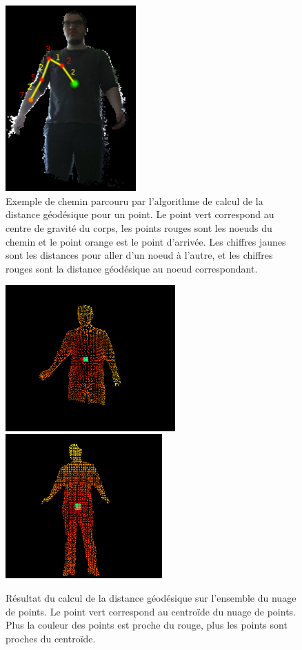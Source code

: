 \begin{figure}[!ht]
  \begin{center}
    \includegraphics[width=5cm]{image/cheminGeodesique.PNG}
    \caption{Exemple de chemin parcouru par l'algorithme de calcul de la distance géodésique pour un point.
    Le point vert correspond au centre de gravité du corps, les points rouges sont les noeuds du chemin et le point 
    orange est le point d'arrivée. Les chiffres jaunes sont les distances pour aller d'un noeud à l'autre, et les chiffres
    rouges sont la distance géodésique au noeud correspondant.}
    \label{fig:cheminGeodesique}
  \end{center}
\end{figure}

\begin{figure}[!ht]
  \begin{center}
    \includegraphics[width=6.5cm]{image/geodesic1.PNG}
    \includegraphics[width=6cm]{image/geodesic2.PNG}
    \caption{Résultat du calcul de la distance géodésique sur l'ensemble du nuage de points. Le point vert correspond au centroïde du
    nuage de points. Plus la couleur des points est proche du rouge, plus les points sont proches du centroïde.}
    \label{fig:geodesique}
  \end{center}
\end{figure}


